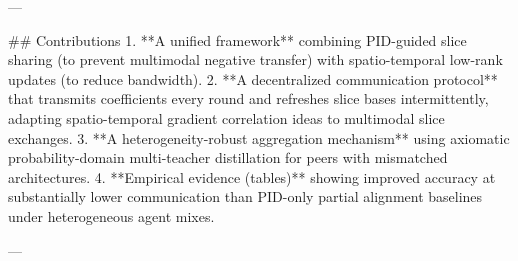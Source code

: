 ---

## Contributions  
1. **A unified framework** combining PID-guided slice sharing (to prevent multimodal negative transfer) with spatio-temporal low-rank updates (to reduce bandwidth).  
2. **A decentralized communication protocol** that transmits coefficients every round and refreshes slice bases intermittently, adapting spatio-temporal gradient correlation ideas to multimodal slice exchanges.  
3. **A heterogeneity-robust aggregation mechanism** using axiomatic probability-domain multi-teacher distillation for peers with mismatched architectures.  
4. **Empirical evidence (tables)** showing improved accuracy at substantially lower communication than PID-only partial alignment baselines under heterogeneous agent mixes.

---